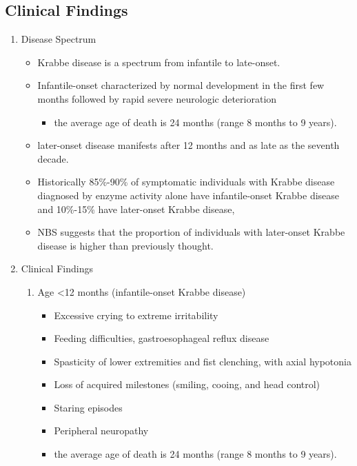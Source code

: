 \documentclass{scrartcl}
\begin{document}
\subsection{Clinical Findings}
\label{sec:org5d304f0}
\begin{enumerate}
\item Disease Spectrum
\label{sec:org1cb9d77}
\begin{itemize}
\item Krabbe disease is a spectrum from infantile to late-onset.

\item Infantile-onset characterized by normal development in the first few
months followed by rapid severe neurologic deterioration
\begin{itemize}
\item the average age of death is 24 months (range 8 months to 9 years).
\end{itemize}

\item later-onset disease manifests after 12 months and as late as the
seventh decade.

\item Historically 85\%-90\% of symptomatic individuals with Krabbe disease
diagnosed by enzyme activity alone have infantile-onset Krabbe
disease and 10\%-15\% have later-onset Krabbe disease,

\item NBS suggests that the proportion of individuals with later-onset
Krabbe disease is higher than previously thought.
\end{itemize}

\item Clinical Findings
\label{sec:org02510aa}

\begin{enumerate}
\item Age <12 months (infantile-onset Krabbe disease)
\label{sec:org99c69e1}

\begin{itemize}
\item Excessive crying to extreme irritability
\item Feeding difficulties, gastroesophageal reflux disease
\item Spasticity of lower extremities and fist clenching, with axial hypotonia
\item Loss of acquired milestones (smiling, cooing, and head control)
\item Staring episodes
\item Peripheral neuropathy
\item the average age of death is 24 months (range 8 months to 9 years).
\end{itemize}


\end{enumerate}
\end{enumerate}
\end{document}
